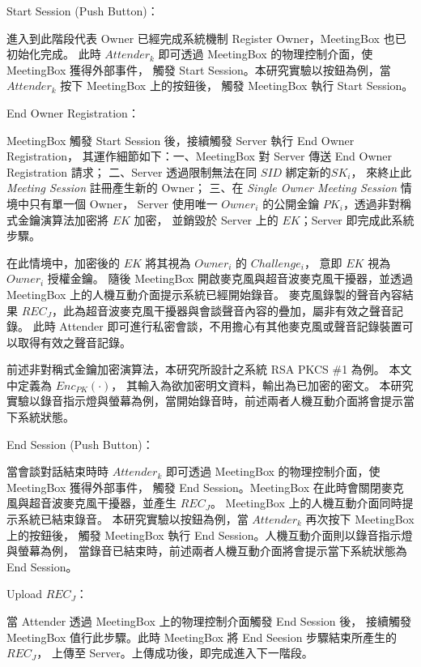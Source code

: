 \begin{steps}
    \item Start Session (Push Button)：

            進入到此階段代表 Owner 已經完成系統機制 Register Owner，MeetingBox 也已初始化完成。
        此時 $Attender_{k}$ 即可透過 MeetingBox 的物理控制介面，使 MeetingBox 獲得外部事件，
        觸發 Start Session。本研究實驗以按鈕為例，當 $Attender_{k}$ 按下 MeetingBox 上的按鈕後，
        觸發 MeetingBox 執行 Start Session。

    \item End Owner Registration：

            MeetingBox 觸發 Start Session 後，接續觸發 Server 執行 End Owner Registration，
        其運作細節如下：一、MeetingBox 對 Server 傳送 End Owner Registration 請求；
        二、Server 透過限制無法在同 $SID$ 綁定新的$SK_{i}$，
        來終止此 {\it Meeting Session} 註冊產生新的 Owner；
        三、在 {\it Single Owner Meeting Session} 情境中只有單一個 Owner，
        Server 使用唯一 $Owner_{i}$ 的公開金鑰 $PK_{i}$，透過非對稱式金鑰演算法加密將 $EK$ 加密，
        並銷毀於 Server 上的 $EK$；Server 即完成此系統步驟。

            在此情境中，加密後的 $EK$ 將其視為 $Owner_{i}$ 的 $Challenge_{i}$，
        意即 $EK$ 視為 $Owner_{i}$ 授權金鑰。
        隨後 MeetingBox 開啟麥克風與超音波麥克風干擾器，並透過 MeetingBox 上的人機互動介面提示系統已經開始錄音。
        麥克風錄製的聲音內容結果 $REC_{J}$，此為超音波麥克風干擾器與會談聲音內容的疊加，屬非有效之聲音記錄。
        此時 Attender 即可進行私密會談，不用擔心有其他麥克風或聲音記錄裝置可以取得有效之聲音記錄。

            前述非對稱式金鑰加密演算法，本研究所設計之系統 RSA PKCS \#1 為例。 本文中定義為 $Enc_{PK}(·)$，
        其輸入為欲加密明文資料，輸出為已加密的密文。
        本研究實驗以錄音指示燈與螢幕為例，當開始錄音時，前述兩者人機互動介面將會提示當下系統狀態。

    \item End Session (Push Button)：

            當會談對話結束時時 $Attender_{k}$ 即可透過 MeetingBox 的物理控制介面，使 MeetingBox 獲得外部事件，
        觸發 End Session。MeetingBox 在此時會關閉麥克風與超音波麥克風干擾器，並產生 $REC_{J}$。
        MeetingBox 上的人機互動介面同時提示系統已結束錄音。
        本研究實驗以按鈕為例，當 $Attender_{k}$ 再次按下 MeetingBox 上的按鈕後，
        觸發 MeetingBox 執行 End Session。人機互動介面則以錄音指示燈與螢幕為例，
        當錄音已結束時，前述兩者人機互動介面將會提示當下系統狀態為 End Session。

    \item Upload $REC_{J}$：

            當 Attender 透過 MeetingBox 上的物理控制介面觸發 End Session 後，
        接續觸發 MeetingBox 值行此步驟。此時 MeetingBox 將 End Seesion 步驟結束所產生的 $REC_{J}$，
        上傳至 Server。上傳成功後，即完成進入下一階段。
\end{steps}


